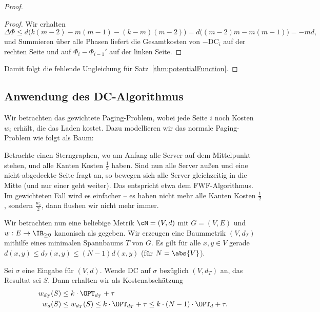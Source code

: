 \documentclass[language=ngerman,algolist]{TemplateLecture}
\begin{document}
\begin{proof}
\begin{proof}
        Wir erhalten 
        \begin{equation*}
            \Delta\Phi \leq d \Big(k(m-2) - m(m-1)- (k-m)(m-2) \Big) = d\Big((m-2)m-m(m-1)\Big) = -md,
        \end{equation*}
        und Summieren über alle Phasen liefert die Gesamtkosten von $-\text{DC}_i$ auf der rechten Seite und auf $\Phi_i - \Phi_{i-1}'$ auf der linken Seite.
    \end{proof}
    Damit folgt die fehlende Ungleichung für Satz~\ref{thm:potentialFunction}.
\end{proof}

\subsection{Anwendung des DC-Algorithmus}

Wir betrachten das gewichtete Paging-Problem, wobei jede Seite $i$ noch Kosten $w_i$ erhält, die das Laden kostet. Dazu modellieren wir das normale Paging-Problem wie folgt als Baum:

Betrachte einen Sterngraphen, wo am Anfang alle Server auf dem Mittelpunkt stehen, und alle Kanten Kosten $\frac{1}{2}$ haben. Sind nun alle Server außen und eine nicht-abgedeckte Seite fragt an, so bewegen sich alle Server gleichzeitig in die Mitte (und nur einer geht weiter). Das entspricht etwa dem FWF-Algorithmus. Im gewichteten Fall wird es einfacher -- es haben nicht mehr alle Kanten Kosten $\frac{1}{2}$, sondern $\frac{w_i}{2}$, dann flushen wir nicht mehr immer.

Wir betrachten nun eine beliebige Metrik $\cM = (V, d)$ mit $G = (V, E)$ und $w: E \to \IR_{\geq 0}$ kanonisch als gegeben. Wir erzeugen eine Baummetrik $(V, d_T)$ mithilfe eines minimalen Spannbaums $T$ von $G$. Es gilt für alle $x, y \in V$ gerade $d(x,y) \leq d_T(x,y) \leq (N-1) d(x,y)$ (für $N = \abs{V}$).

Sei $\sigma$ eine Eingabe für $(V, d)$. Wende DC auf $\sigma$ bezüglich $(V, d_T)$ an, das Resultat sei $S$. Dann erhalten wir als Kostenabschätzung
\begin{equation*}
    \begin{split}
        w_{d_T}(S) &\leq k \cdot \OPT_{d_T} + \tau \\
        w_d(S) &\leq w_{d_T}(S) \leq k \cdot \OPT_{d_T} + \tau \leq k \cdot (N-1) \cdot \OPT_d + \tau.
    \end{split}
\end{equation*}
\end{document}
